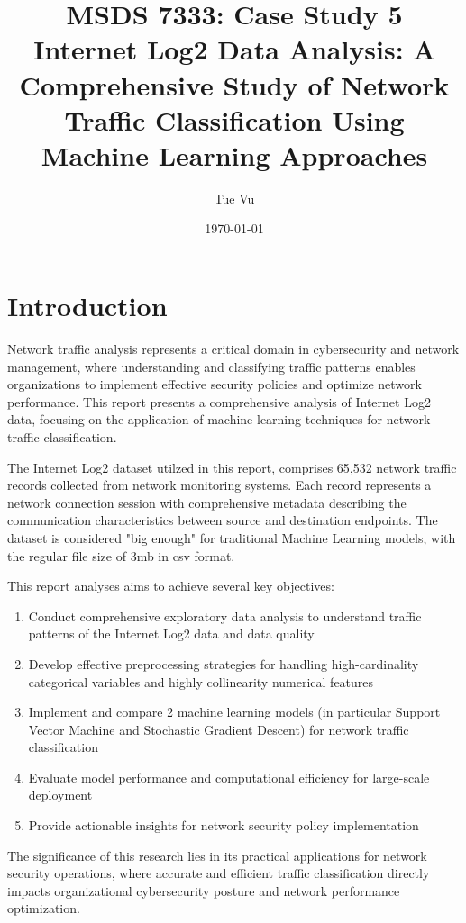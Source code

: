\documentclass[12pt,a4paper]{article}
\title{\textbf{MSDS 7333: Case Study 5} \\ Internet Log2 Data Analysis: A Comprehensive Study of Network Traffic Classification Using Machine Learning Approaches}
\author{Tue Vu}
\date{\today}
\begin{document}
\maketitle

\newpage

\section{Introduction}

Network traffic analysis represents a critical domain in cybersecurity and network management, where understanding and classifying traffic patterns enables organizations to implement effective security policies and optimize network performance. This report presents a comprehensive analysis of Internet Log2 data, focusing on the application of machine learning techniques for network traffic classification.

The Internet Log2 dataset utilzed in this report, comprises 65,532 network traffic records collected from network monitoring systems. Each record represents a network connection session with comprehensive metadata describing the communication characteristics between source and destination endpoints.
The dataset is considered "big enough" for traditional Machine Learning models, with the regular file size of 3mb in csv format. 

This report analyses aims to achieve several key objectives:

\begin{enumerate}
    \item Conduct comprehensive exploratory data analysis to understand traffic patterns of the Internet Log2 data and data quality
    \item Develop effective preprocessing strategies for handling high-cardinality categorical variables and highly collinearity numerical features
    \item Implement and compare 2 machine learning models (in particular Support Vector Machine and Stochastic Gradient Descent) for network traffic classification
    \item Evaluate model performance and computational efficiency for large-scale deployment
    \item Provide actionable insights for network security policy implementation
\end{enumerate}

The significance of this research lies in its practical applications for network security operations, where accurate and efficient traffic classification directly impacts organizational cybersecurity posture and network performance optimization.
\end{document}
